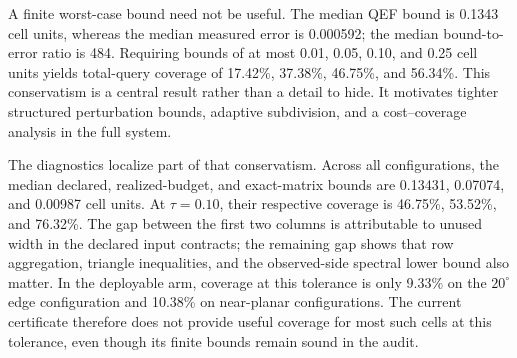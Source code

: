 \documentclass[11pt]{article}
\theoremstyle{definition}
\begin{document}
\begin{table}[t]
\centering
\caption{Configuration-wise QEF usefulness and diagnostic decomposition.
``Realized'' uses the errors that occurred in each trial; ``matrix'' uses exact
matrix perturbations and the true spectral denominator.  Both are
nondeployable diagnostics.  Coverage uses \(\tau=0.10\) cell units.}
\label{tab:qef}
\end{table}

A finite worst-case bound need not be useful.  The median QEF bound is 0.1343
cell units, whereas the median measured error is 0.000592; the median
bound-to-error ratio is 484.  Requiring bounds of at most 0.01, 0.05, 0.10,
and 0.25 cell units yields total-query coverage of 17.42\%, 37.38\%, 46.75\%,
and 56.34\%.  This conservatism is a central result rather than a detail to
hide.  It motivates tighter structured perturbation bounds, adaptive
subdivision, and a cost--coverage analysis in the full system.

The diagnostics localize part of that conservatism.  Across all configurations,
the median declared, realized-budget, and exact-matrix bounds are 0.13431,
0.07074, and 0.00987 cell units.  At \(\tau=0.10\), their respective coverage
is 46.75\%, 53.52\%, and 76.32\%.  The gap between the first two columns is
attributable to unused width in the declared input contracts; the remaining
gap shows that row aggregation, triangle inequalities, and the observed-side
spectral lower bound also matter.  In the deployable arm, coverage at this
tolerance is only 9.33\% on the \(20^\circ\) edge configuration and 10.38\%
on near-planar configurations.  The current certificate therefore does not
provide useful coverage for most such cells at this tolerance, even though its
finite bounds remain sound in the audit.
\end{document}
